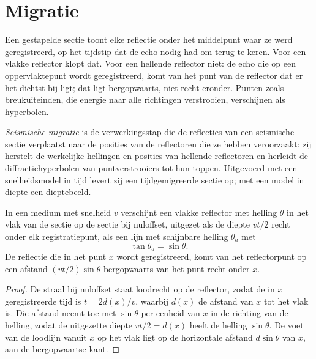 \section{Migratie}

Een gestapelde sectie toont elke reflectie onder het middelpunt waar ze werd
geregistreerd, op het tijdstip dat de echo nodig had om terug te keren. Voor een vlakke
reflector klopt dat. Voor een hellende reflector niet: de echo die op een oppervlaktepunt
wordt geregistreerd, komt van het punt van de reflector dat er het dichtst bij ligt;
dat ligt bergopwaarts, niet recht eronder. Punten zoals breukuiteinden, die energie naar alle
richtingen verstrooien, verschijnen als hyperbolen.

\begin{definition}\label{def:b3:exploration-seismology:migration}
\emph{Seismische migratie} is de verwerkingsstap die
de reflecties van een seismische sectie verplaatst naar de posities van de reflectoren
die ze hebben veroorzaakt: zij herstelt de werkelijke hellingen en posities van
hellende reflectoren en herleidt de diffractiehyperbolen van puntverstrooiers tot hun
toppen. Uitgevoerd met een snelheidsmodel in tijd levert zij een tijdgemigreerde
sectie op; met een model in diepte een dieptebeeld.
\end{definition}

\begin{theorem}\label{thm:b3:exploration-seismology:dip}
In een medium met snelheid $v$ verschijnt een vlakke reflector met helling $\theta$ in het
vlak van de sectie op de sectie bij nuloffset, uitgezet als de diepte $vt/2$
recht onder elk registratiepunt, als een lijn met schijnbare helling $\theta_a$
met
\[
  \tan\theta_a = \sin\theta .
\]
De reflectie die in het punt $x$ wordt geregistreerd, komt van het reflectorpunt op een
afstand $(vt/2)\sin\theta$ bergopwaarts van het punt recht onder $x$.
\end{theorem}

\begin{proof}
De straal bij nuloffset staat loodrecht op de reflector, zodat de in $x$ geregistreerde tijd is
$t = 2d(x)/v$, waarbij $d(x)$ de afstand van $x$ tot het vlak is. Die afstand
neemt toe met $\sin\theta$ per eenheid van $x$ in de richting van de helling, zodat de
uitgezette diepte $vt/2 = d(x)$ heeft de helling $\sin\theta$. De voet van de loodlijn vanuit $x$
op het vlak ligt op de horizontale afstand $d\sin\theta$ van $x$, aan de
bergopwaartse kant.
\end{proof}


